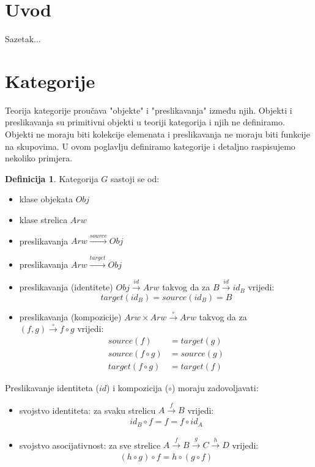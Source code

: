 \documentclass[11pt]{article}
\theoremstyle{definition}
\newtheorem{definition}{Definicija}
\begin{document}
  \section{Uvod}
  Sazetak...
  \newpage
  \section{Kategorije}
  Teorija kategorije proučava "objekte" i "preslikavanja" između
  njih. Objekti i preslikavanja su primitivni objekti u teoriji kategorija i
  njih ne definiramo. Objekti ne moraju biti kolekcije elemenata i
  preslikavanja ne moraju biti funkcije na skupovima.
  U ovom poglavlju definiramo kategorije i detaljno raspisujemo nekoliko
  primjera.
  \begin{definition}
    Kategorija $G$ sastoji se od:
    \begin{itemize}
      \item klase objekata $Obj$
      \item klase strelica $Arw$
      \item preslikavanja $Arw \xrightarrow{source} Obj$
      \item preslikavanja $Arw \xrightarrow{target} Obj$
      \item preslikavanja (identitete) $Obj \xrightarrow{id} Arw$ takvog da
      za $B \xrightarrow{id} id_B$ vrijedi:
        \begin{equation}
          target(id_B) = source(id_B) = B
        \end{equation}
      \item preslikavanja (kompozicije) $Arw \times Arw \xrightarrow{\circ}
      Arw$ takvog da za \\ $(f, g) \xrightarrow{\circ} f \circ g$ vrijedi:
        \begin{align}
          source(f) &= target(g) \\
          source(f \circ g) &= source(g) \\
          target(f \circ g) &= target(f)
        \end{align}
    \end{itemize}
    Preslikavanje identiteta ($id$) i kompozicija ($\circ$) moraju
    zadovoljavati:
    \begin{itemize}
      \item svojstvo identiteta: za svaku strelicu $A \xrightarrow{f} B$ vrijedi:
        \begin{align}
          id_B \circ f = f = f \circ id_A
        \end{align}
      \item svojstvo asocijativnost: za sve strelice $A \xrightarrow{f} B
      \xrightarrow{g} C \xrightarrow{h} D$ vrijedi:
        \begin{align} \label{def:kat_assoc}
          (h \circ g) \circ f = h \circ (g \circ f)
        \end{align}
    \end{itemize}
  \end{definition}
\end{document}
